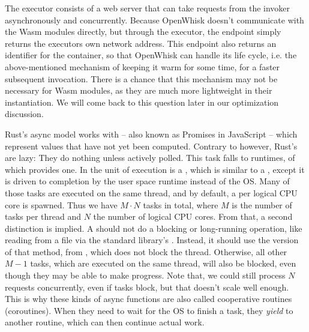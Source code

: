 The executor consists of a web server that can take requests from the invoker asynchronously and concurrently. Because OpenWhisk doesn't communicate with the Wasm modules directly, but through the executor, the  endpoint simply returns the executors own network address. This endpoint also returns an identifier for the container, so that OpenWhisk can handle its life cycle, i.e. the above-mentioned mechanism of keeping it warm for some time, for a faster subsequent invocation. There is a chance that this mechanism may not be necessary for Wasm modules, as they are much more lightweight in their instantiation. We will come back to this question later in our optimization discussion.


Rust's async model works with  -- also known as Promises in JavaScript -- which represent values that have not yet been computed. Contrary to  however, Rust's  are lazy: They do nothing unless actively polled. This task falls to  runtimes, of which  provides one. In  the unit of execution is a , which is similar to a , except it is driven to completion by the user space runtime instead of the OS. Many of those tasks are executed on the same thread, and by default, a  per logical CPU core is spawned. Thus we have $M \cdot N$ tasks in total, where $M$ is the number of tasks per thread and $N$ the number of logical CPU cores.
From that, a second distinction is implied. A  should not do a blocking or long-running operation, like reading from a file via the standard library's . Instead, it should use the  version of that method, from , which does not block the thread. Otherwise, all other $M - 1$ tasks, which are executed on the same thread, will also be blocked, even though they may be able to make progress. Note that, we could still process $N$ requests concurrently, even if tasks block, but that doesn't scale well enough. This is why these kinds of async functions are also called cooperative routines (coroutines). When they need to wait for the OS to finish a task, they \emph{yield} to another routine, which can then continue actual work.

